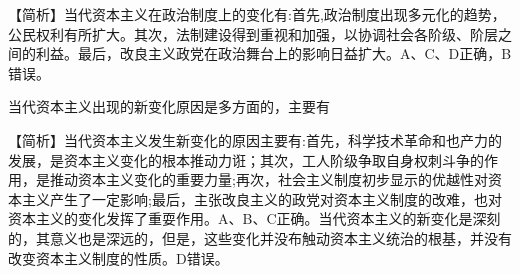 \begin{solution}【简析】当代资本主义在政治制度上的变化有:首先,政治制度出现多元化的趋势，公民权利有所扩大。其次，法制建设得到重视和加强，以协调社会各阶级、阶层之间的利益。最后，改良主义政党在政治舞台上的影响日益扩大。A、C、D正确，B错误。
\end{solution}
\question 当代资本主义出现的新变化原因是多方面的，主要有
\par{}
\begin{solution}【简析】当代资本主义发生新变化的原因主要有:首先，科学技术革命和也产力的发展，是资本主义变化的根本推动力诳；其次，工人阶级争取自身权刺斗争的作用，是推动资本主义变化的重要力量;再次，社会主义制度初步显示的优越性对资本主义产生了一定影响;最后，主张改良主义的政党对资本主义制度的改难，也对资本主义的变化发挥了重耍作用。A、B、C正确。当代资本主义的新变化是深刻的，其意义也是深远的，但是，这些变化并没布触动资本主义统治的根基，并没有改变资本主义制度的性质。D错误。
\end{solution}
